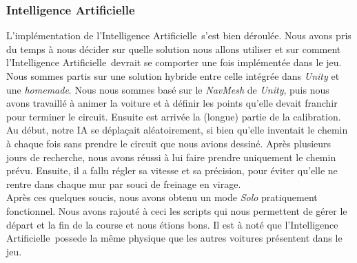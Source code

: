 \documentclass[a4paper,12pt]{article}
\newcommand{\AI}{Intelligence Artificielle}
\begin{document}
            \subsubsection{\AI}
                L'implémentation de l'\AI\, s'est bien déroulée. Nous avons pris du temps
                à nous décider sur quelle solution nous allons utiliser et sur comment
                l'\AI\, devrait se comporter une fois implémentée dans le jeu. Nous sommes partis sur une
                solution hybride entre celle intégrée dans \textsl{Unity} et une \textit{homemade}.
                Nous nous sommes basé sur le \textit{NavMesh} de \textsl{Unity}, puis nous avons
                travaillé à animer la voiture et à définir les points qu'elle devait franchir pour
                terminer le circuit. Ensuite est arrivée
                la (longue) partie de la calibration. Au début, notre IA se déplaçait aléatoirement,
                si bien qu'elle inventait le chemin à chaque fois sans prendre le circuit que nous
                avions dessiné. Après plusieurs jours de recherche, nous avons réussi à lui faire
                prendre uniquement le chemin prévu. Ensuite, il a fallu régler sa vitesse et sa
                précision, pour éviter qu'elle ne rentre dans chaque mur par souci de freinage en virage.\\
                Après ces quelques soucis, nous avons obtenu un mode \textsl{Solo} pratiquement
                fonctionnel. Nous avons rajouté à ceci les scripts qui nous permettent de gérer
                le départ et la fin de la course et nous étions bons. Il est à noté que l'\AI\ possede la même 
                physique que les autres voitures présentent dans le jeu.
\end{document}
